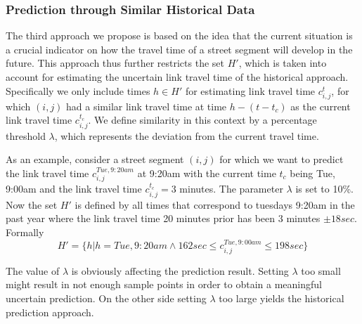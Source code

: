 \subsubsection{Prediction through Similar Historical Data}
\label{subsec:SH}
The third approach we propose is based on the idea that the current situation
is a crucial indicator on how the travel time of a street segment will develop
in the future. This approach thus further restricts the set $H'$, which is taken
into account for estimating the uncertain link travel time of the historical
approach. Specifically we only include times $h \in H'$ for estimating link travel time
$c_{i,j}^t$, for which $(i, j)$ had a similar link travel time at time
$h-(t-t_c)$ as the current link travel time $c_{i,j}^{t_c}$. We define
similarity in this context by a percentage threshold $\lambda$, which represents
the deviation from the current travel time.

 As an example, consider a street segment $(i, j)$ for which we want to
 predict the link travel time $c_{i,j}^{Tue, 9:20am}$ at 9:20am with the current
 time $t_c$ being Tue, 9:00am and the link travel time $c_{i,j}^{t_c} = 3$
 minutes. The parameter $\lambda$ is set to 10\%. Now the set $H'$ is defined by all times
that correspond to tuesdays 9:20am in the past year where the link travel time 20 minutes prior has been 3 minutes $\pm 18 sec$. Formally
$$H' = \{h|h = Tue,9:20am \wedge 162 sec \leq c_{i,j}^{Tue, 9:00am} \leq 198
sec\}$$

The value of $\lambda$ is obviously affecting the prediction result.
Setting $\lambda$ too small might result in not enough sample points in order to
obtain a meaningful uncertain prediction. On the other side setting $\lambda$
too large yields the historical prediction approach.


